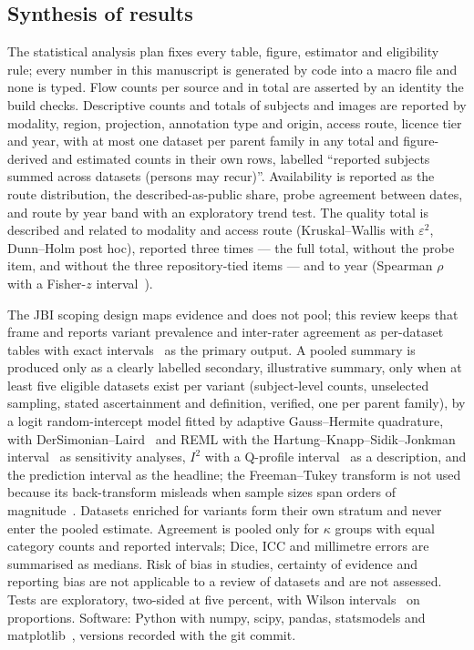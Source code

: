 \documentclass[11pt,a4paper]{article}
\begin{document}
\subsection{Synthesis of results}\label{sec:synthesis}
The statistical analysis plan fixes every table, figure, estimator and eligibility rule; every number in this manuscript is generated by code into a macro file and none is typed. Flow counts per source and in total are asserted by an identity the build checks. Descriptive counts and totals of subjects and images are reported by modality, region, projection, annotation type and origin, access route, licence tier and year, with at most one dataset per parent family in any total and figure-derived and estimated counts in their own rows, labelled ``reported subjects summed across datasets (persons may recur)''. Availability is reported as the route distribution, the described-as-public share, probe agreement between dates, and route by year band with an exploratory trend test. The quality total is described and related to modality and access route (Kruskal--Wallis with $\varepsilon^{2}$, Dunn--Holm post hoc), reported three times --- the full total, without the probe item, and without the three repository-tied items --- and to year (Spearman $\rho$ with a Fisher-$z$ interval~\citep{bonett2000spearman}).

The JBI scoping design maps evidence and does not pool; this review keeps that frame and reports variant prevalence and inter-rater agreement as per-dataset tables with exact intervals~\citep{clopper1934} as the primary output. A pooled summary is produced only as a clearly labelled secondary, illustrative summary, only when at least five eligible datasets exist per variant (subject-level counts, unselected sampling, stated ascertainment and definition, verified, one per parent family), by a logit random-intercept model fitted by adaptive Gauss--Hermite quadrature, with DerSimonian--Laird~\citep{dersimonian1986} and REML with the Hartung--Knapp--Sidik--Jonkman interval~\citep{inthout2014hksj} as sensitivity analyses, $I^{2}$ with a Q-profile interval~\citep{higgins2002} as a description, and the prediction interval as the headline; the Freeman--Tukey transform is not used because its back-transform misleads when sample sizes span orders of magnitude~\citep{schwarzer2019}. Datasets enriched for variants form their own stratum and never enter the pooled estimate. Agreement is pooled only for $\kappa$ groups with equal category counts and reported intervals; Dice, ICC and millimetre errors are summarised as medians. Risk of bias in studies, certainty of evidence and reporting bias are not applicable to a review of datasets and are not assessed. Tests are exploratory, two-sided at five percent, with Wilson intervals~\citep{wilson1927} on proportions. Software: Python with numpy, scipy, pandas, statsmodels and matplotlib~\citep{harris2020numpy,virtanen2020scipy,seabold2010statsmodels}, versions recorded with the git commit.
\end{document}
